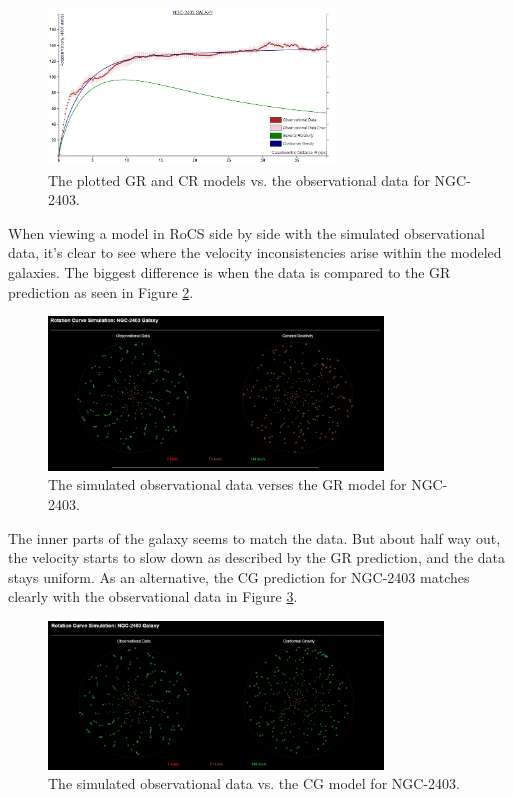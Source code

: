 \documentclass[conference]{IEEEtran}
\begin{document}
\begin{figure}[h!]
\centering
\includegraphics[width=3in, frame]{NGC-2403-PLOT}
\caption{The plotted GR and CR models vs. the observational data for NGC-2403.}
\label{ngc2403plot}
\end{figure}

When viewing a model in RoCS side by side with the simulated observational data, it's clear to see where the velocity inconsistencies arise within the modeled galaxies. The biggest difference is when the data is compared to the GR prediction as seen in Figure \ref{ngc2403gr}.

\begin{figure}[h!]
\centering
\includegraphics[width=3.5in]{NGC-2403-GR}
\caption{The simulated observational data verses the GR model for NGC-2403.}
\label{ngc2403gr}
\end{figure}

The inner parts of the galaxy seems to match the data. But about half way out, the velocity starts to slow down as described by the GR prediction, and the data stays uniform. As an alternative, the CG prediction for NGC-2403 matches clearly with the observational data in Figure \ref{ngc2403cg}.

\begin{figure}[h!]
\centering
\includegraphics[width=3.5in]{NGC-2403-CG}
\caption{The simulated observational data vs. the CG model for NGC-2403.}
\label{ngc2403cg}
\end{figure}
 \newpage
\end{document}

